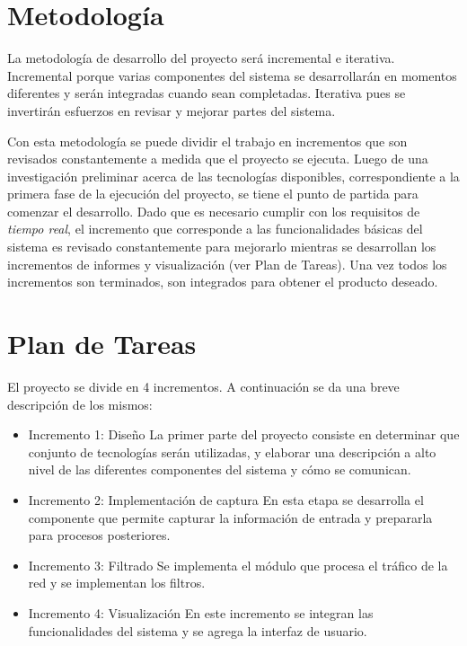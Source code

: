 \section*{Metodología}

La metodología de desarrollo del proyecto será incremental e iterativa. Incremental porque varias componentes del sistema se desarrollarán en momentos diferentes y serán integradas cuando sean completadas. Iterativa pues se invertirán esfuerzos en revisar y mejorar partes del sistema.

Con esta metodología se puede dividir el trabajo en incrementos que son revisados constantemente a medida que el proyecto se ejecuta. Luego de una investigación preliminar acerca de las tecnologías disponibles, correspondiente a la primera fase de la ejecución del proyecto, se tiene el punto de partida para comenzar el desarrollo. Dado que es necesario cumplir con los requisitos de \textit{tiempo real}, el incremento que corresponde a las funcionalidades básicas del sistema es revisado constantemente para mejorarlo mientras se desarrollan los incrementos de informes y visualización (ver Plan de Tareas). Una vez todos los incrementos son terminados, son integrados para obtener el producto deseado.

\section*{Plan de Tareas}

El proyecto se divide en 4 incrementos. A continuación se da una breve descripción de los mismos:

\begin{itemize}
\item Incremento 1: Diseño
La primer parte del proyecto consiste en determinar que conjunto de tecnologías serán utilizadas, y elaborar una descripción a alto nivel de las diferentes componentes del sistema y cómo se comunican.
\item Incremento 2: Implementación de captura
En esta etapa se desarrolla el componente que permite capturar la información de entrada y prepararla para procesos posteriores.
\item Incremento 3: Filtrado
Se implementa el módulo que procesa el tráfico de la red y se implementan los filtros.
\item Incremento 4: Visualización
En este incremento se integran las funcionalidades del sistema y se agrega la interfaz de usuario.
\end{itemize}


